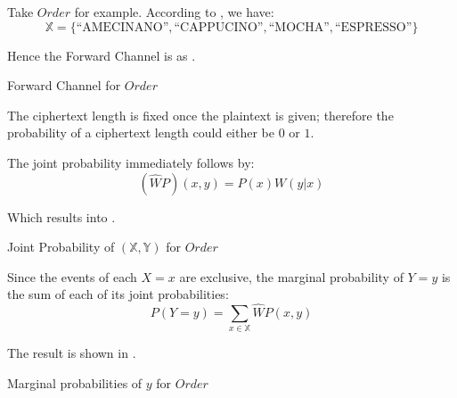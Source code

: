 \begin{example} \label{Ex: Single_Order}
Take $Order$ for example. According to , we have:
\begin{equation*}
\mathbb{X} = \{\text{“AMECINANO”}, \text{“CAPPUCINO”}, \text{“MOCHA”}, \text{“ESPRESSO”}\}
\end{equation*}

Hence the Forward Channel is as . 
\begin{table}[H]
\begin{center}
{}
\end{center}
\caption{Forward Channel for $Order$}
\label{Tbl: Forward Channel for Order}
\end{table}

The ciphertext length is fixed once the plaintext is given; therefore the probability of a ciphertext length could either be $0$ or $1$.

The joint probability immediately follows by:
\begin{equation}
(\widehat{W}P)(x,y) = P(x)W(y|x)
\end{equation}

Which results into .

\begin{table}[H]
\begin{center}
{}
\end{center}
\caption{Joint Probability of $(\mathbb{X},\mathbb{Y})$ for $Order$}
\label{Tbl: Joint Probability of (X Y) for Order}
\end{table}

Since the events of each $X=x$ are exclusive, the marginal probability of $Y=y$ is the sum of each of its joint probabilities:
\begin{equation}
P(Y=y) = \sum\limits_{x \in \mathbb{X}}{\widehat{W}P(x,y)}
\end{equation}

The result is shown in .

\begin{table}[H]
\begin{center}
{}
\end{center}
\caption{Marginal probabilities of $y$ for $Order$}
\label{Tbl: Marginal Probabilities of y for Order}
\end{table}


\end{example}
